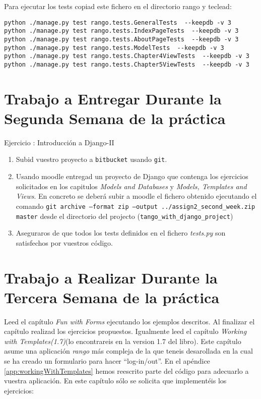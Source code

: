 \documentclass[12pt]{article} %
\newcounter{ejercicioNo}
\begin{document}
Para ejecutar los tests copiad este fichero en el directorio rango y teclead:
\begin{verbatim}
python ./manage.py test rango.tests.GeneralTests  --keepdb -v 3
python ./manage.py test rango.tests.IndexPageTests  --keepdb -v 3
python ./manage.py test rango.tests.AboutPageTests  --keepdb -v 3
python ./manage.py test rango.tests.ModelTests  --keepdb -v 3
python ./manage.py test rango.tests.Chapter4ViewTests  --keepdb -v 3
python ./manage.py test rango.tests.Chapter5ViewTests  --keepdb -v 3
\end{verbatim}



\section{Trabajo a Entregar Durante la Segunda Semana de la práctica}

\begin{minipage}{\linewidth}
\begin{framed}
\addtocounter{ejercicioNo}{1} 
Ejercicio : Introducción a Django-II
\begin{enumerate}
\item Subid vuestro proyecto a \texttt{bitbucket} usando \texttt{git}. 

\item Usando moodle entregad un proyecto de Django que contenga los ejercicios solicitados en los capitulos \textit{Models and Databases} y  \textit{Models, Templates and Views}. En concreto se deberá subir a moodle el fichero obtenido ejecutando el comando \texttt{git archive --format zip --output ../assign2\_second\_week.zip  master} desde el directorio del projecto (\texttt{tango\_with\_django\_project})

\item Aseguraros de que todos los tests definidos en el fichero \textit{tests.py} son satisfechos por vuestros código.
\end{enumerate}
\end{framed}
\end{minipage}

\section{Trabajo a Realizar Durante la Tercera Semana de la práctica}

Leed el capítulo \textit{Fun with Forms}  ejecutando los ejemplos descritos.
Al finalizar el capítulo  realizad los ejercicios propuestos. Igualmente leed el capítulo
\textit{Working with Templates(1.7)}(lo encontrareis en la version 1.7 del libro). Este capítulo  
asume una aplicación \textit{rango} más compleja de la que teneis desarollada en la cual se ha creado un formulario para hacer ``log-in/out''. En el apéndice \ref{app:workingWithTemplates}
hemos reescrito parte del código para adecuarlo a vuestra aplicación. En este capítulo sólo se solicita que implementéis los ejercicios:
\end{document}

